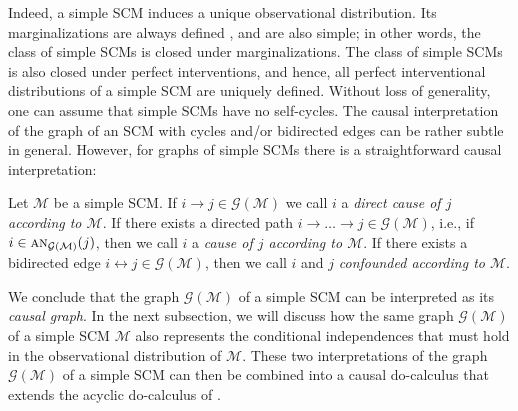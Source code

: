 \documentclass[twoside,11pt]{article}
\newcommand\C[1]{\mathcal{#1}}
\newcommand\mathbfsc[1]{\text{\normalfont\scshape#1}}
\newcommand\ansub[2]{\mathbfsc{an}_{#1}(#2)}
\newcommand{\oto}{\leftrightarrow}
\begin{document}
Indeed, a simple SCM induces a unique observational distribution. 
Its marginalizations are always defined \citep{Bongers++_1611.06221v2},
and are also simple; in other words, the class of simple SCMs is closed under marginalizations. 
The class of simple SCMs is also closed under perfect interventions, and hence, 
all perfect interventional distributions of a simple SCM are uniquely defined. 
Without loss of generality, one can assume that simple SCMs have no self-cycles. 
The causal interpretation of the graph of an SCM with cycles and/or bidirected edges can be rather subtle in general.
However, for graphs of simple SCMs there is a straightforward causal interpretation:
\begin{definition}
  Let $\C{M}$ be a simple SCM. If $i \to j \in \C{G}(\C{M})$ we call $i$ a \emph{direct cause of $j$ according to $\C{M}$}.
  If there exists a directed path $i \to \dots \to j \in \C{G}(\C{M})$, i.e., if $i \in \ansub{\C{G}(\C{M})}{j}$, then we call
  $i$ a \emph{cause of $j$ according to $\C{M}$}. If there exists a bidirected edge $i \oto j \in \C{G}(\C{M})$, then we call
  $i$ and $j$ \emph{confounded according to $\C{M}$}.
\end{definition}

We conclude that the graph $\C{G}(\C{M})$ of a simple SCM can be interpreted as its \emph{causal graph}.
In the next subsection, we will discuss how the same graph $\C{G}(\C{M})$ of a simple SCM $\C{M}$ also represents
the conditional independences that must hold in the observational distribution of $\C{M}$.
These two interpretations of the graph $\C{G}(\C{M})$ of a simple SCM can then be combined into a causal do-calculus \citep{ForreMooij_UAI_19} that extends the acyclic do-calculus of \cite{Pearl2009}.

\end{document}
